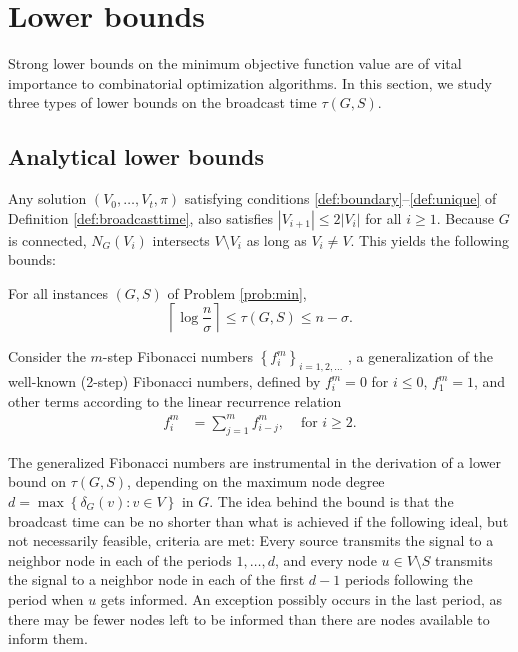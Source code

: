 \section{Lower bounds} \label{sec:lb}
Strong lower bounds on the minimum objective function value are of vital importance to combinatorial optimization algorithms.
In this section, we study three types of lower bounds on the broadcast time $\tau(G,S)$.

\subsection{Analytical lower bounds} \label{sec:lbanalyt}
Any solution $\left(V_0,\ldots,V_t,\pi\right)$ satisfying conditions \ref{def:boundary}--\ref{def:unique} of Definition \ref{def:broadcasttime},
also satisfies $\left|V_{i+1}\right|\leq 2\left|V_i\right|$ for all $i\geq 1$.
Because $G$ is connected, $N_G\left(V_i\right)$ intersects $V\setminus V_i$ as long as $V_i\neq V$.
This yields the following bounds:
\begin{observation}
For all instances $(G,S)$ of Problem \ref{prob:min},
\begin{equation}
\left\lceil\log\frac{n}{\sigma}\right\rceil\leq \tau(G,S) \leq n-\sigma.
\label{eq:loglb}
\end{equation}
\label{obs:loglb}
\end{observation}

Consider the $m$-step Fibonacci numbers $\left\{f^{m}_i\right\}_{i=1,2,\ldots}$ \cite{noe05}, a generalization of the well-known (2-step) Fibonacci numbers, defined by
$f^{m}_i=0$ for $i\leq 0$, $f^{m}_1=1$, and 
other terms according to the linear recurrence relation 
\begin{align*}
f^{m}_i &=\sum\limits_{j=1}^m f^{m}_{i-j}, &\text{ for } i\geq 2.
\end{align*}

The generalized Fibonacci numbers are instrumental in the derivation of a lower bound on $\tau(G,S)$,
depending on the maximum node degree $d=\max\left\{\delta_G(v): v\in V\right\}$ in $G$.
The idea behind the bound is that the broadcast time can be no shorter than what is achieved if
the following ideal, but not necessarily feasible, criteria are met:
Every source transmits the signal to a neighbor node in each of the periods $1,\ldots,d$,
and every node $u\in V\setminus S$
transmits the signal to a neighbor node in each of the first $d-1$ periods following the period when $u$ gets informed.
An exception possibly occurs in the last period, as there may be fewer nodes left to be informed than there are nodes available to inform them.


